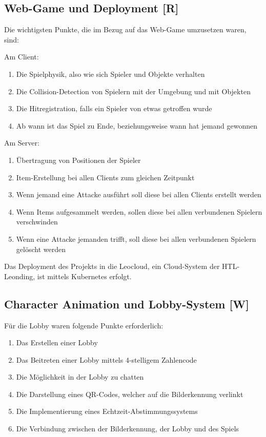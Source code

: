 \subsection{Web-Game und Deployment [R]}
Die wichtigsten Punkte, die im Bezug auf das Web-Game umzusetzen waren, sind:
\begin{compactitem}
    \item Am Client:
    \begin{enumerate}
        \item Die Spielphysik, also wie sich Spieler und Objekte verhalten
        \item Die Collision-Detection von Spielern mit der Umgebung und mit Objekten
        \item Die Hitregistration, falls ein Spieler von etwas getroffen wurde
        \item Ab wann ist das Spiel zu Ende, beziehungsweise wann hat jemand gewonnen
    \end{enumerate}
    \item Am Server:
    \begin{enumerate}
        \item Übertragung von Positionen der Spieler
        \item Item-Erstellung bei allen Clients zum gleichen Zeitpunkt
        \item Wenn jemand eine Attacke ausführt soll diese bei allen Clients erstellt werden
        \item Wenn Items aufgesammelt werden, sollen diese bei allen verbundenen Spielern verschwinden
        \item Wenn eine Attacke jemanden trifft, soll diese bei allen verbundenen Spielern gelöscht werden
    \end{enumerate}

\end{compactitem}
Das Deployment des Projekts in die Leocloud, ein Cloud-System der HTL-Leonding, ist mittels Kubernetes erfolgt.


\subsection{Character Animation und Lobby-System [W]}
    Für die Lobby waren folgende Punkte erforderlich:
    \begin{enumerate}
        \item Das Erstellen einer Lobby
        \item Das Beitreten einer Lobby mittels 4-stelligem Zahlencode
        \item Die Möglichkeit in der Lobby zu chatten
        \item Die Darstellung eines QR-Codes, welcher auf die Bilderkennung verlinkt
        \item Die Implementierung eines Echtzeit-Abstimmungssystems
        \item Die Verbindung zwischen der Bilderkennung, der Lobby und des Spiels
    \end{enumerate}


